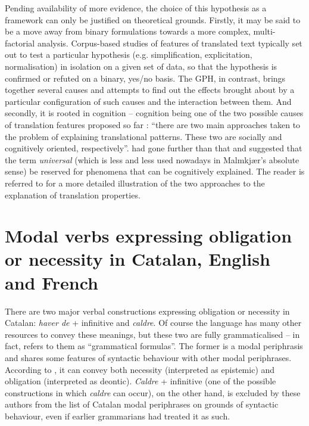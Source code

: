 \documentclass[output=paper,english,spanish,german,english]{langsci/langscibook}
\begin{document}
Pending availability of more evidence, the choice of this hypothesis as a framework can only be justified on theoretical grounds. Firstly, it may be said to be a move away from binary formulations towards a more complex, multi-factorial analysis. Corpus-based studies of features of translated text typically set out to test a particular hypothesis (e.g. simplification, explicitation, normalisation) in isolation on a given set of data, so that the hypothesis is confirmed or refuted on a binary, yes/no basis. The GPH, in contrast, brings together several causes and attempts to find out the effects brought about by a particular configuration of such causes and the interaction between them. And secondly, it is rooted in cognition -- cognition being one of the two possible causes of translation features proposed so far \parencite[10]{halverson17}: \enquote{there are two main approaches taken to the problem of explaining translational patterns. These two are socially and cognitively oriented, respectively}. \citet[57]{malmkjaer08} had gone further than that and suggested that the term \textit{universal} (which is less and less used nowadays in Malmkjær’s absolute sense) be reserved for phenomena that can be cognitively explained. The reader is referred to \citet{halverson17} for a more detailed illustration of the two approaches to the explanation of translation properties.

\section{Modal verbs expressing obligation or necessity in Catalan, English and French}\label{mvs}

There are two major verbal constructions expressing obligation or necessity in Catalan: \textit{haver de} + infinitive and \textit{caldre}. Of course the language has many other resources to convey these meanings, but these two are fully grammaticalised -- in fact, \citet[611]{badia94} refers to them as \enquote{grammatical formulas}. The former is a modal periphrasis and shares some features of syntactic behaviour with other modal periphrases. According to \citet[2714]{gavlac02}, it can convey both necessity (interpreted as epistemic) and obligation (interpreted as deontic). \textit{Caldre} + infinitive (one of the possible constructions in which \textit{caldre} can occur), on the other hand, is excluded by these authors \parencite*[2710]{gavlac02} from the list of Catalan modal periphrases on grounds of syntactic behaviour, even if earlier grammarians \parencite[cf.][]{badia94} had treated it as such.
\end{document}
